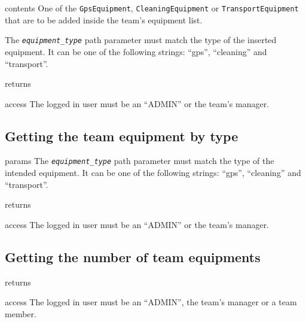 \begin{apidata}{contents}
  One of the \texttt{GpsEquipment}, \texttt{CleaningEquipment} or
  \texttt{TransportEquipment} that are to be added inside the team's equipment
  list.

  The \texttt{\emph{equipment\_type}} path parameter must match the type of the
  inserted equipment. It can be one of the following strings: ``gps'',
  ``cleaning'' and ``transport''.
\end{apidata}
\begin{apidata}{returns}
  \begin{datalist}
  \end{datalist}
\end{apidata}
\begin{apidata}{access}
The logged in user must be an ``ADMIN'' or the team's manager.
\end{apidata}

\subsection{Getting the team equipment by type}
\label{sec:team:eq_by_type}

\begin{apidata}{params}
  The \texttt{\emph{equipment\_type}} path parameter must match the type of the
  intended equipment. It can be one of the following strings: ``gps'',
  ``cleaning'' and ``transport''.
\end{apidata}
\begin{apidata}{returns}
  \begin{datalist}
  \end{datalist}
\end{apidata}
\begin{apidata}{access}
The logged in user must be an ``ADMIN'' or the team's manager.
\end{apidata}

\subsection{Getting the number of team equipments}
\label{sec:team:eq_cnt}

\begin{apidata}{returns}
  \begin{datalist}
  \end{datalist}
\end{apidata}
\begin{apidata}{access}
The logged in user must be an ``ADMIN'', the team's manager or a team member.
\end{apidata}

